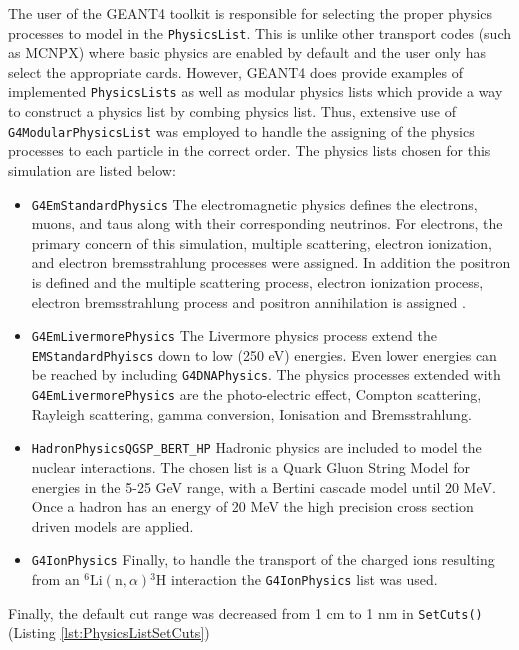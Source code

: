 The user of the GEANT4 toolkit is responsible for selecting the proper physics processes to model in the \verb+PhysicsList+.
This is unlike other transport codes (such as MCNPX) where basic physics are enabled by default and the user only has select the appropriate cards.
However, GEANT4 does provide examples of implemented \verb+PhysicsLists+ as well as modular physics lists which provide a way to construct a physics list by combing physics list.
Thus, extensive use of \verb+G4ModularPhysicsList+ was employed to handle the assigning of the physics processes to each particle in the correct order.
The physics lists chosen for this simulation are listed below:
\begin{itemize}
    \item \verb+G4EmStandardPhysics+ The electromagnetic physics defines the electrons, muons, and taus along with their corresponding neutrinos. For electrons, the primary concern of this simulation, multiple scattering, electron ionization, and electron bremsstrahlung processes were assigned.  In addition the positron is defined and the multiple scattering process, electron ionization process, electron bremsstrahlung process and positron annihilation is assigned \cite{cern_physics_2012}.
    \item \verb+G4EmLivermorePhysics+ The Livermore physics process extend the \verb+EMStandardPhyiscs+ down to low (250 eV) energies. Even lower energies can be reached by including \verb+G4DNAPhysics+. The physics processes extended with \verb+G4EmLivermorePhysics+ are the photo-electric effect, Compton scattering, Rayleigh scattering, gamma conversion, Ionisation and Bremsstrahlung\cite{cern_physics_2012}. 
    \item \verb+HadronPhysicsQGSP_BERT_HP+ Hadronic physics are included to model the nuclear interactions. The chosen list is a Quark Gluon String Model for energies in the 5-25 GeV range, with a Bertini cascade model until 20 MeV.  Once a hadron has an energy of 20 MeV the high precision cross section driven models are applied\cite{cern_reference_2008}.
    \item \verb+G4IonPhysics+ Finally, to handle the transport of the charged ions resulting from an ${}^6\text{Li}(\text{n},\alpha){}^{3}\text{H}$ interaction the \verb+G4IonPhysics+ list was used.
\end{itemize}

Finally, the default cut range was decreased from 1 cm to 1 nm in \verb+SetCuts()+ (Listing \ref{lst:PhysicsListSetCuts}) 

